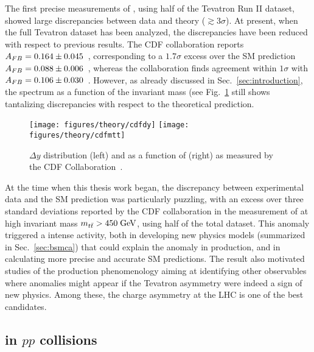 The first precise measurements of \afb, using half
of the Tevatron Run II dataset, showed large discrepancies between
data and theory ($\gtrsim 3\sigma$).
At present, when the full Tevatron dataset has been analyzed, the
discrepancies have been reduced with respect to previous results. The
CDF collaboration reports \mbox{$A_{FB}=0.164\pm0.045$}~\cite{Aaltonen:2012it},
corresponding to a $1.7\sigma$ excess over the SM prediction \mbox{$A_{FB}{} =
0.088\pm{}0.006$}~\cite{Bernreuther:2012sx}, whereas the \dzero{} collaboration
finds agreement within $1\sigma$ with
\mbox{$A_{FB}{}=0.106\pm0.030$}~\cite{Abazov:2014cca}. However, as
already discussed in Sec.~\ref{sec:introduction}, the \afb{} spectrum as a
function of the \ttbar{} invariant mass \mtt{} (see
Fig.~\ref{fig:cdfafb} still shows tantalizing discrepancies with
respect to the theoretical prediction.

\begin{figure}[!htb]\centering
  \texttt{[image: figures/theory/cdfdy]}
  \texttt{[image: figures/theory/cdfmtt]}
  \caption{$\Delta{}y$ distribution (left)
    and \afb{} as a function of \mtt{} (right) as measured by the CDF
    Collaboration~\cite{Aaltonen:2012it}.} 
  \label{fig:cdfafb}
\end{figure}

At the time when this thesis work began, the discrepancy between
experimental data and the SM prediction was particularly puzzling,
with an excess over three standard deviations reported by the CDF
collaboration in the measurement of \afb{} at high \ttbar{} invariant
mass $m_{t\bar{t}}{}>450\; \mathrm{GeV}{}$, using half of the total dataset. This anomaly
triggered a intense activity, both in developing new physics models
(summarized in Sec.~\ref{sec:bsmca})
that could explain the anomaly in \ttbar{} production, and in
calculating more precise and accurate SM predictions. The result also
motivated studies of the \ttbar{} production phenomenology aiming at
identifying other observables where anomalies might appear if the
Tevatron asymmetry were indeed a sign of new physics. Among these, the
charge asymmetry at the LHC is one of the best candidates. 

\subsection{\ac{} in $pp$ collisions}

